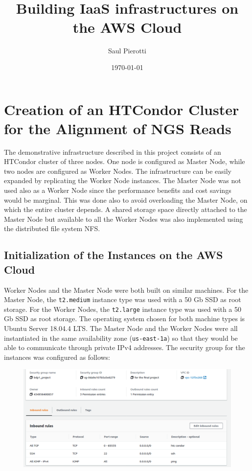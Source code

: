 \documentclass{article}
\begin{document}
\title{Building IaaS infrastructures on the AWS Cloud}
\author{Saul Pierotti}
\date{\today}

\maketitle

\section{Creation of an HTCondor Cluster for the Alignment of NGS Reads}
The demonstrative infrastructure described in this project consists of an HTCondor cluster of three nodes.
One node is configured as Master Node, while two nodes are configured as Worker Nodes.
The infrastructure can be easily expanded by replicating the Worker Node instances.
The Master Node was not used also as a Worker Node since the performance benefits and cost savings would be marginal.
This was done also to avoid overloading the Master Node, on which the entire cluster depends.
A shared storage space directly attached to the Master Node but available to all the Worker Nodes was also implemented using the distributed file system NFS.

\subsection{Initialization of the Instances on the AWS Cloud}
Worker Nodes and the Master Node were both built on similar machines.
For the Master Node, the \texttt{t2.medium} instance type was used with a 50 Gb SSD as root storage.
For the Worker Nodes, the \texttt{t2.large} instance type was used with a 50 Gb SSD as root storage.
The operating system chosen for both machine types is Ubuntu Server 18.04.4 LTS.
The Master Node and the Worker Nodes were all instantiated in the same availability zone (\texttt{us-east-1a}) so that they would be able to communicate through private IPv4 addresses.
The security group for the instances was configured as follows:

\begin{figure}[!h]
    \center
    \includegraphics[width=\textwidth]{./images/security-group.png}
\end{figure}
\end{document}
